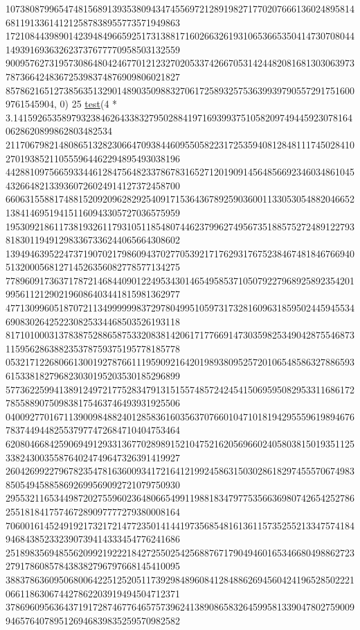 \begin{DoxyCode}
      107380879965474815689139353809434745569721289198271770207666136024895814681191336141212587838955773571949863
      172108443989014239484966592517313881716026632619310653665350414730708044149391693632623737677770958503132559
      900957627319573086480424677012123270205337426670531424482081681303063973787366424836725398374876909806021827
      8578621651273856351329014890350988327061725893257536399397905572917516009761545904, 0)
25 \hyperlink{namespacetest_math_accae4d78fc0739220d35c06c2c0d5822}{test}(4 * 3.14159265358979323846264338327950288419716939937510582097494459230781640628620899862803482534
      211706798214808651328230664709384460955058223172535940812848111745028410270193852110555964462294895493038196
      442881097566593344612847564823378678316527120190914564856692346034861045432664821339360726024914127372458700
      660631558817488152092096282925409171536436789259036001133053054882046652138414695194151160943305727036575959
      195309218611738193261179310511854807446237996274956735188575272489122793818301194912983367336244065664308602
      139494639522473719070217986094370277053921717629317675238467481846766940513200056812714526356082778577134275
      778960917363717872146844090122495343014654958537105079227968925892354201995611212902196086403441815981362977
      477130996051870721134999999837297804995105973173281609631859502445945534690830264252230825334468503526193118
      817101000313783875288658753320838142061717766914730359825349042875546873115956286388235378759375195778185778
      053217122680661300192787661119590921642019893809525720106548586327886593615338182796823030195203530185296899
      577362259941389124972177528347913151557485724245415069595082953311686172785588907509838175463746493931925506
      040092770167113900984882401285836160356370766010471018194295559619894676783744944825537977472684710404753464
      620804668425906949129331367702898915210475216205696602405803815019351125338243003558764024749647326391419927
      260426992279678235478163600934172164121992458631503028618297455570674983850549458858692699569092721079750930
      295532116534498720275596023648066549911988183479775356636980742654252786255181841757467289097777279380008164
      706001614524919217321721477235014144197356854816136115735255213347574184946843852332390739414333454776241686
      251898356948556209921922218427255025425688767179049460165346680498862723279178608578438382796797668145410095
      388378636095068006422512520511739298489608412848862694560424196528502221066118630674427862203919494504712371
      378696095636437191728746776465757396241389086583264599581339047802759009946576407895126946839835259570982582

\end{DoxyCode}
